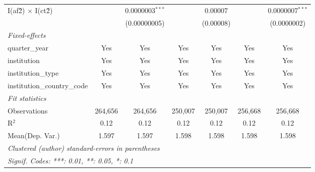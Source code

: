 \begin{tabular}{lcccccc}
   I(af\^2) $\times$ I(ct\^2)         &               & 0.0000003$^{***}$ &               & 0.00007        &               & 0.0000007$^{***}$\\   
                                      &               & (0.00000005)      &               & (0.00008)      &               & (0.0000002)\\   
   \midrule
   \emph{Fixed-effects}\\
   quarter\_year                      & Yes           & Yes               & Yes           & Yes            & Yes           & Yes\\  
   institution                        & Yes           & Yes               & Yes           & Yes            & Yes           & Yes\\  
   institution\_type                  & Yes           & Yes               & Yes           & Yes            & Yes           & Yes\\  
   institution\_country\_code         & Yes           & Yes               & Yes           & Yes            & Yes           & Yes\\  
   \midrule
   \emph{Fit statistics}\\
   Observations                       & 264,656       & 264,656           & 250,007       & 250,007        & 256,668       & 256,668\\  
   R$^2$                              & 0.12          & 0.12              & 0.12          & 0.12           & 0.12          & 0.12\\  
Mean(Dep. Var.) & 1.597 & 1.597 & 1.598 & 1.598 & 1.598 & 1.598 \\
   \midrule \midrule
   \multicolumn{7}{l}{\emph{Clustered (author) standard-errors in parentheses}}\\
   \multicolumn{7}{l}{\emph{Signif. Codes: ***: 0.01, **: 0.05, *: 0.1}}\\
\end{tabular}
\par\endgroup
